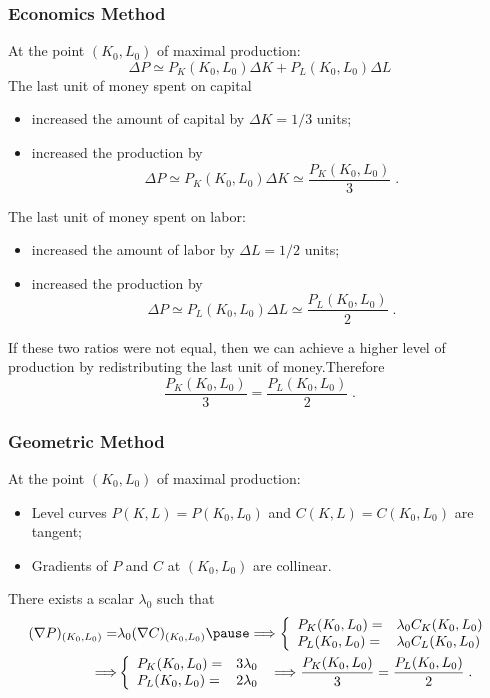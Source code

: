 \begin{frame}
  \frametitle{Economics Method}

  At the point $(K_0,L_0)$ of maximal production:
$$\Delta P \simeq P_K(K_0,L_0) \Delta K + P_L(K_0,L_0) \Delta L$$
%
\pause The last unit of money spent on capital
\begin{itemize}
  \item \pause increased the amount of capital by $\Delta K = 1/3$ units;
  \item \pause increased the production by
%
$$\Delta P \simeq P_K(K_0,L_0) \Delta K \simeq \frac{P_K(K_0,L_0)}{3}\; .$$
\end{itemize}

\pause The last unit of money spent on labor:
\begin{itemize}
  \item \pause increased the amount of labor by $\Delta L = 1/2$ units;
  \item \pause increased the production by
%
$$\Delta P \simeq P_L(K_0,L_0) \Delta L \simeq \frac{P_L(K_0,L_0)}{2}\; .$$
%
\end{itemize}

\pause If these two ratios were not equal, then \pause we can achieve a higher level of production by redistributing the last unit of money.\pause Therefore \pause
%
$$\frac{P_K(K_0,L_0)}{3} = \frac{P_L(K_0,L_0)}{2}\;  .$$
\end{frame}

\begin{frame}
  \frametitle{Geometric Method}

  At the point $(K_0,L_0)$ of maximal production:\pause

\begin{itemize}
  \item Level curves $P(K,L) = P(K_0,L_0)$ and $C(K,L) = C(K_0,L_0)$ are tangent;\pause
  \item Gradients of $P$ and $C$ at $(K_0,L_0)$ are  collinear.
\end{itemize}

\pause There exists a scalar $\lambda_0$ such that
%
\begin{align*}
  (\nabla P)_{(K_0,L_0)} = & \lambda_0 (\nabla C)_{(K_0,L_0)} \pause \Longrightarrow
\left\{ \begin{array}{ll}
  P_K(K_0,L_0) = & \lambda_0 C_K(K_0,L_0) \\
  P_L(K_0,L_0) = & \lambda_0 C_L(K_0,L_0)
\end{array}
\right. \\
\Longrightarrow & \left\{ \begin{array}{ll}
  P_K(K_0,L_0) = & 3 \lambda_0 \\
  P_L(K_0,L_0) = & 2 \lambda_0
\end{array}
\right. \; \Longrightarrow \frac{P_K(K_0,L_0)}{3}=\frac{P_L(K_0,L_0)}{2}\; .
\end{align*}
%
\end{frame}


